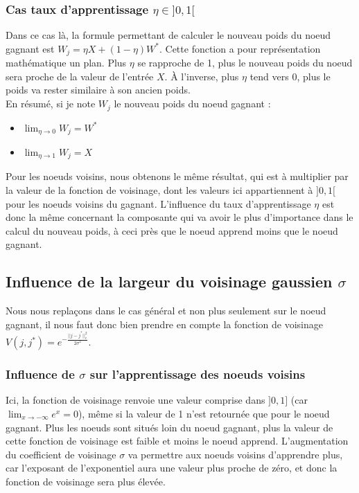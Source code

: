 \documentclass{article}
\begin{document}
\subsubsection{Cas taux d'apprentissage $\eta \in  ]0,1[$} 

Dans ce cas là, la formule permettant de calculer le nouveau poids du noeud gagnant est $W_j = \eta X + (1-\eta) W^*$. Cette fonction a pour représentation mathématique un plan. Plus $\eta$ se rapproche de 1, plus le nouveau poids du noeud sera proche de la valeur de l'entrée $X$. À l'inverse, plus $\eta$ tend vers 0, plus le poids va rester similaire à son ancien poids.
\\En résumé, si je note $W_j$ le nouveau poids du noeud gagnant :
\begin{itemize}
    \item $\lim_{\eta \to 0} W_j = W^*$
    \item $\lim_{\eta \to 1} W_j = X$
\end{itemize}
Pour les noeuds voisins, nous obtenons le même résultat, qui est à multiplier par la valeur de la fonction de voisinage, dont les valeurs ici appartiennent à $]0,1[$ pour les noeuds voisins du gagnant. L'influence du taux d'apprentissage $\eta$ est donc la même concernant la composante qui va avoir le plus d'importance dans le calcul du nouveau poids, à ceci près que le noeud apprend moins que le noeud gagnant.


\subsection{Influence de la largeur du voisinage gaussien $\sigma$}

Nous nous replaçons dans le cas général et non plus seulement sur le noeud gagnant, il nous faut donc bien prendre en compte la fonction de voisinage $V(j,j^*) =  e^{-\frac{||j-j^*||^2_c}{2\sigma^2}}$.

\subsubsection{Influence de $\sigma$ sur l'apprentissage des noeuds voisins} 

Ici, la fonction de voisinage renvoie une valeur comprise dans $]0,1]$ (car $\lim_{x \to - \infty} e^x = 0$), même si la valeur de 1 n'est retournée que pour le noeud gagnant. Plus les noeuds sont situés loin du noeud gagnant, plus la valeur de cette fonction de voisinage est faible et moins le noeud apprend.
L'augmentation du coefficient de voisinage $\sigma$ va permettre aux noeuds voisins d'apprendre plus, car l'exposant de l'exponentiel aura une valeur plus proche de zéro, et donc la fonction de voisinage sera plus élevée.
\end{document}

